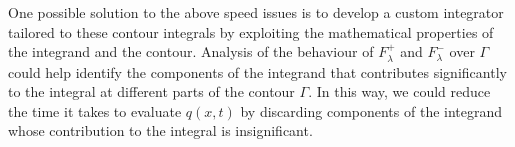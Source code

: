 \documentclass[12pt, oneside, a4paper]{article}
\begin{document}
One possible solution to the above speed issues is to develop a custom integrator tailored to these contour integrals by exploiting the mathematical properties of the integrand and the contour. Analysis of the behaviour of $F_\lambda^+$ and $F_\lambda^-$ over $\Gamma$ could help identify the components of the integrand that contributes significantly to the integral at different parts of the contour $\Gamma$. In this way, we could reduce the time it takes to evaluate $q(x,t)$ by discarding components of the integrand whose contribution to the integral is insignificant.

\newpage
{}

\newpage

% 

\end{document}
